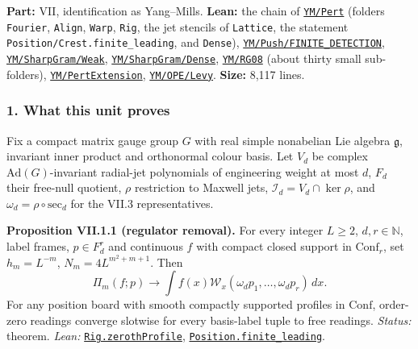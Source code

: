 \documentclass[
  letterpaper,
  11pt]{article}
\begin{document}
\textbf{Part:} VII, identification as Yang--Mills. \textbf{Lean:} the
chain of
\href{https://github.com/yang-mills-group/OpenAI-YM-20261028/tree/3456e5e75cf8d4cd558955a5c7638fba2d68f464/YM/Pert}{\texttt{YM/Pert}}
(folders \texttt{Fourier}, \texttt{Align}, \texttt{Warp}, \texttt{Rig},
the jet stencils of \texttt{Lattice}, the statement
\texttt{Position/Crest.finite\_leading}, and \texttt{Dense}),
\href{https://github.com/yang-mills-group/OpenAI-YM-20261028/tree/3456e5e75cf8d4cd558955a5c7638fba2d68f464/YM/Push/FINITE_DETECTION}{\texttt{YM/Push/FINITE\_DETECTION}},
\href{https://github.com/yang-mills-group/OpenAI-YM-20261028/tree/3456e5e75cf8d4cd558955a5c7638fba2d68f464/YM/SharpGram/Weak}{\texttt{YM/SharpGram/Weak}},
\href{https://github.com/yang-mills-group/OpenAI-YM-20261028/tree/3456e5e75cf8d4cd558955a5c7638fba2d68f464/YM/SharpGram/Dense}{\texttt{YM/SharpGram/Dense}},
\href{https://github.com/yang-mills-group/OpenAI-YM-20261028/tree/3456e5e75cf8d4cd558955a5c7638fba2d68f464/YM/RG08}{\texttt{YM/RG08}}
(about thirty small sub-folders),
\href{https://github.com/yang-mills-group/OpenAI-YM-20261028/tree/3456e5e75cf8d4cd558955a5c7638fba2d68f464/YM/PertExtension}{\texttt{YM/PertExtension}},
\href{https://github.com/yang-mills-group/OpenAI-YM-20261028/tree/3456e5e75cf8d4cd558955a5c7638fba2d68f464/YM/OPE/Levy}{\texttt{YM/OPE/Levy}}.
\textbf{Size:} 8,117 lines.

\subsubsection{1. What this unit proves}\label{what-this-unit-proves-25}

Fix a compact matrix gauge group \(G\) with real simple nonabelian Lie
algebra \(\mathfrak g\), invariant inner product and orthonormal colour
basis. Let \(V_d\) be complex \(\mathrm{Ad}(G)\)-invariant radial-jet
polynomials of engineering weight at most \(d\), \(F_d\) their free-null
quotient, \(\rho\) restriction to Maxwell jets,
\(\mathcal I_d=V_d\cap\ker\rho\), and
\(\omega_d=\rho\circ\mathrm{sec}_d\) for the VII.3 representatives.

\textbf{Proposition VII.1.1 (regulator removal).} For every integer
\(L\ge2\), \(d,r\in\mathbb N\), label frames, \(p\in F_d^r\) and
continuous \(f\) with compact closed support in \(\mathrm{Conf}_r\), set
\(h_m=L^{-m}\), \(N_m=4L^{m^2+m+1}\). Then
\[\Pi_m(f;p)\longrightarrow\int f(x)\mathcal W_x(\omega_dp_1,\ldots,\omega_dp_r)\,dx.\]
For any position board with smooth compactly supported profiles in
\(\mathrm{Conf}\), order-zero readings converge slotwise for every
basis-label tuple to free readings. \emph{Status:} theorem. \emph{Lean:}
\href{https://github.com/yang-mills-group/OpenAI-YM-20261028/blob/3456e5e75cf8d4cd558955a5c7638fba2d68f464/YM/Pert/Rig/Linked.lean\#L59-L69}{\texttt{Rig.zerothProfile}},
\href{https://github.com/yang-mills-group/OpenAI-YM-20261028/blob/3456e5e75cf8d4cd558955a5c7638fba2d68f464/YM/Pert/Position/Crest.lean\#L13-L16}{\texttt{Position.finite\_leading}}.
\end{document}
